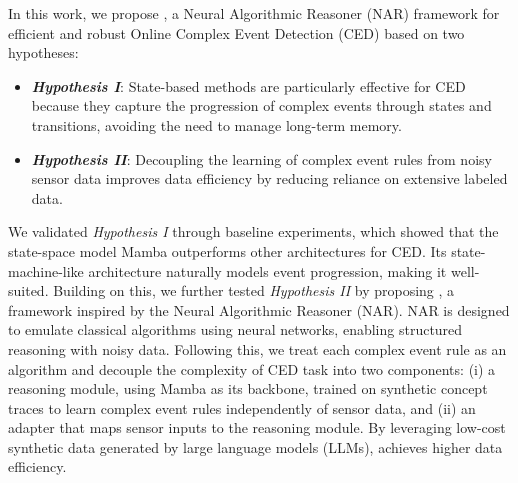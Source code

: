 

In this work, we propose \narce{}, a Neural Algorithmic Reasoner (NAR) framework for efficient and robust Online Complex Event Detection (CED) based on two hypotheses: 
\begin{itemize}[leftmargin=1em, nosep]
    \item \textbf{\emph{Hypothesis I}}: State-based methods are particularly effective for CED because they capture the progression of complex events through states and transitions, avoiding the need to manage long-term memory. 
    \item \textbf{\emph{Hypothesis II}}: Decoupling the learning of complex event rules from noisy sensor data improves data efficiency by reducing reliance on extensive labeled data.
\end{itemize}
We validated \emph{Hypothesis I} through baseline experiments, which showed that the state-space model Mamba outperforms other architectures for CED. Its state-machine-like architecture naturally models event progression, making it well-suited. Building on this, we further tested \emph{Hypothesis II} by proposing \narce{}, a framework inspired by the Neural Algorithmic Reasoner (NAR)\cite{narbenchmark,generalnar,naroverview}. NAR is designed to emulate classical algorithms using neural networks, enabling structured reasoning with noisy data. Following this, we treat each complex event rule as an algorithm and decouple the complexity of CED task into two components: (i) a reasoning module, using Mamba as its backbone, trained on synthetic concept traces to learn complex event rules independently of sensor data, and (ii) an adapter that maps sensor inputs to the reasoning module. By leveraging low-cost synthetic data generated by large language models (LLMs), \narce{} achieves higher data efficiency.

